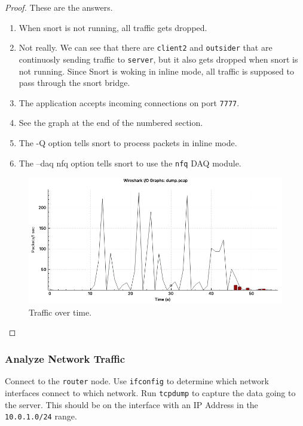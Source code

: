 \documentclass[a4paper,11pt,hidelinks]{article}
\begin{document}
\begin{proof}
    These are the answers.
    \begin{enumerate}
        \item When snort is not running, all traffic gets dropped.
        \item Not really. We can see that there are \verb=client2= and \verb=outsider= that are continuosly sending traffic to \verb=server=, but it also gets dropped when snort is not running. Since Snort is woking in inline mode, all traffic is supposed to pass through the snort bridge.
        \item The application accepts incoming connections on port \verb=7777=.
        \item See the graph at the end of the numbered section.
        \item The -Q option tells snort to process packets in inline mode.
        \item The --daq nfq option tells snort to use the \verb=nfq= DAQ module.
    \end{enumerate}

    \begin{figure}[h!]
        \centering
        \includegraphics[width=\textwidth]{../drawable/traffic.png}
        \caption{Traffic over time.}
    \end{figure}

\end{proof}

\subsubsection{Analyze Network Traffic}

Connect to the \verb=router= node. Use \verb=ifconfig= to determine which network interfaces connect to which network. Run \verb=tcpdump= to capture the data going to the server. This should be on the interface with an IP Address in the \verb=10.0.1.0/24= range. 
\end{document}
